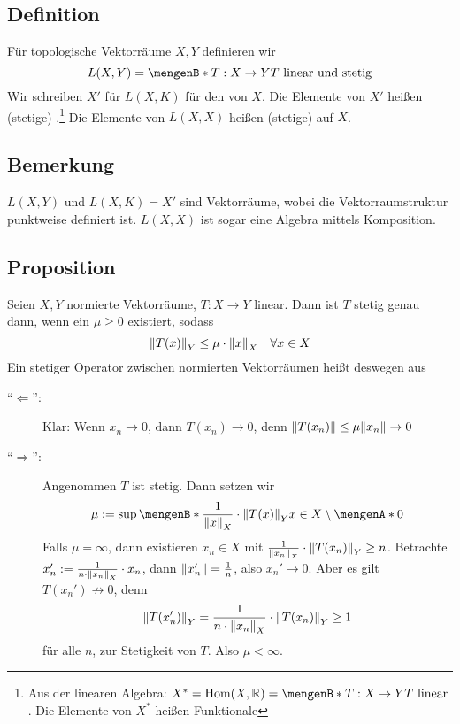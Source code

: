 \subsection[Definition: Stetige Funktionale und Operatoren]{Definition} %
\label{sub:25}
Für topologische Vektorräume $X,Y$ definieren wir 
\[
	L(X,Y) = \set[T : X \to Y]{T \text{ linear und stetig}}  
\]
Wir schreiben $X'$ für $L(X,K)$ für den  von $X$. Die Elemente von $X'$ heißen (stetige) .\footnote{Aus der linearen Algebra: $X^* = \Hom(X,\mathds{R}) = \set[T : X \to Y]{T \text{ linear}}$. Die Elemente von $X^*$ heißen Funktionale}
Die Elemente von $L(X,X)$ heißen (stetige)  auf $X$. 

\subsection{Bemerkung} %
\label{sub:26}
$L(X,Y)$ und $L(X,K) = X'$ sind Vektorräume, wobei die Vektorraumstruktur punktweise definiert ist. $L(X,X)$ ist sogar eine Algebra mittels Komposition.

\subsection{Proposition} %
\label{sub:27}
Seien $X,Y$ normierte Vektorräume, $T : X \to Y$ linear. Dann ist $T$ stetig genau dann, wenn ein $\mu \ge 0$ existiert, sodass 
\[
	\norm[Y]{T(x)} \le \mu \cdot \norm[X]{x} \quad \forall x \in X  
\]
Ein stetiger Operator zwischen normierten Vektorräumen heißt deswegen aus  
\begin{description}
	\item[\enquote{$\Leftarrow$}:] Klar: Wenn $x_n \to 0$, dann $T(x_n) \to 0$, denn $\norm{T(x_n)} \le \mu \norm{x_n } \to 0$
	\item[\enquote{$\Rightarrow $}:] Angenommen $T$ ist stetig. Dann setzen wir
	\[
		\mu := \sup \set[{\frac{1}{\norm[X]{x}} \cdot \norm[Y]{T(x)}  }]{x \in X \setminus \set{0} } 
	\] 
	Falls $\mu = \infty$, dann existieren $x_n \in X$ mit $\frac{1}{\norm[X]{x_n}} \cdot \norm[Y]{T(x_n)} \ge n$. Betrachte 
	$x_n' :=  \frac{1}{n \cdot \norm[X]{x_n}} \cdot x_n $, dann $\norm{x_n'} = \frac{1}{n}$, also $x_n' \to 0$. Aber es gilt $T(x_n')\not\to 0$, denn
	\begin{align*}
		\norm[Y]{T(x_n')} = \frac{1}{n \cdot \norm[X]{x_n} } \cdot \norm[Y]{T(x_n)} \ge 1 
	\end{align*}
	für alle $n$, \light zur Stetigkeit von $T$. Also $\mu < \infty$. \bewende
\end{description}

